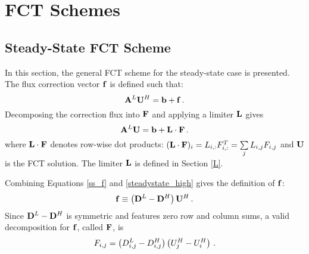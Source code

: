 \section{FCT Schemes}
\subsection{Steady-State FCT Scheme}
In this section, the general FCT scheme for the steady-state case is presented.
The flux correction vector $\mathbf{f}$ is defined such that:
\begin{equation}\label{ss_f}
   \mathbf{A}^L\mathbf{U}^H = \mathbf{b} + \mathbf{f} \,.
\end{equation}
Decomposing the correction flux into $\mathbf{F}$ and applying a limiter
$\mathbf{L}$ gives
\begin{equation}\label{FCT_limited_ss}
   \mathbf{A}^L\mathbf{U} = \mathbf{b} + \mathbf{L}\cdot\mathbf{F} \,.
\end{equation}
where $\mathbf{L}\cdot\mathbf{F}$ denotes row-wise dot products: $(\mathbf{L}\cdot\mathbf{F})_i = L_{i,:}F_{i,:}^T
= \sum\limits_j L_{i,j} F_{i,j}$ and $\mathbf{U}$ is the FCT solution.  The limiter $\mathbf{L}$ is
defined in Section \ref{L}.

Combining Equations \eqref{ss_f} and \eqref{steadystate_high}
gives the definition of $\mathbf{f}$:
\begin{equation}
   \mathbf{f} \equiv \left(\mathbf{D}^L-\mathbf{D}^H\right)\mathbf{U}^H \,.
\end{equation}
Since $\mathbf{D}^L-\mathbf{D}^H$ is symmetric
and features zero row and column sums, a valid decomposition for $\mathbf{f}$,
called $\mathbf{F}$, is
\begin{equation}
   F_{i,j} = \left(D_{i,j}^L-D_{i,j}^H\right)\left(U_j^H - U_i^H\right) \,.
\end{equation}
